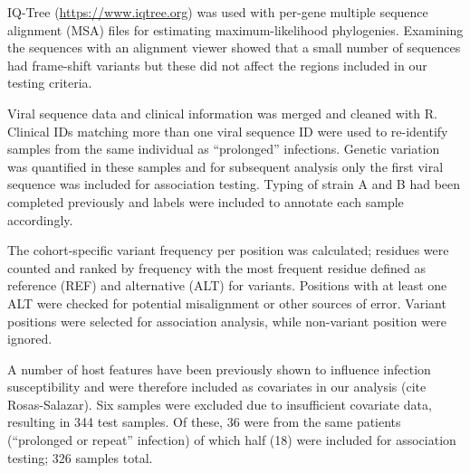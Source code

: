 \documentclass{article} %
\begin{document}
IQ-Tree 
(\url{https://www.iqtree.org})
\cite{nguyen2015iq}
was used with per-gene multiple sequence alignment (MSA) files for estimating maximum-likelihood phylogenies.
Examining the sequences with an alignment viewer showed that a small number of sequences had frame-shift variants but these did not affect the regions included in our testing criteria.

Viral sequence data and clinical information was merged and cleaned with R.
Clinical IDs matching more than one viral sequence ID were used to re-identify samples from the same individual as ``prolonged'' infections. 
Genetic variation was quantified in these samples and for subsequent analysis only the first viral sequence was included for association testing. 
Typing of strain A and B had been completed previously and labels were included to annotate each sample accordingly.

The cohort-specific variant frequency per position was calculated;
residues were counted and ranked by frequency
with the most frequent residue defined as reference (REF) and alternative (ALT) for variants.
Positions with at least one ALT were checked for potential misalignment or other sources of error. 
Variant positions were selected for association analysis, while non-variant position were ignored.

A number of host features have been previously shown to influence infection susceptibility and were therefore included as covariates in our analysis (cite Rosas-Salazar).
Six samples were excluded due to insufficient covariate data, resulting in 344 test samples. 
Of these, 36 were from the same patients (``prolonged or repeat'' infection) of which half (18) were included for association testing; 326 samples total.
\end{document}

